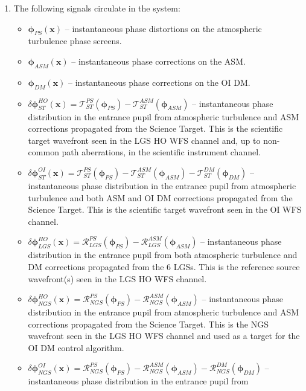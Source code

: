 \begin{enumerate}
	\item The following signals circulate in the system:
	\begin{itemize}
		\item $\bm{\phi}_{PS}^{}(\bm{x})$ -- instantaneous phase distortions on the
		atmospheric turbulence phase screens.
		\item $\bm{\phi}_{ASM}^{}(\bm{x})$ -- instantaneous phase corrections on the
		ASM.
		\item $\bm{\phi}_{DM}^{}(\bm{x})$ -- instantaneous phase corrections on the
		OI DM.
		\item $\delta \bm{\phi}^{HO}_{ST} (\bm{x}) = \mathcal{T}^{PS}_{ST}
		(\bm{\phi}_{PS}^{}) - \mathcal{T}^{ASM}_{ST} (\bm{\phi}_{ASM}^{})$
		-- instantaneous phase distribution in the entrance pupil from
		atmospheric turbulence and ASM corrections propagated from the Science
		Target. This is the scientific target wavefront seen in the LGS HO WFS
		channel and, up to
		non-common path aberrations, in the scientific instrument channel.
		\item $\delta \bm{\phi}^{OI}_{ST} (\bm{x}) = \mathcal{T}^{PS}_{ST}
		(\bm{\phi}_{PS}^{}) - \mathcal{T}^{ASM}_{ST} (\bm{\phi}_{ASM}^{}) -
		\mathcal{T}^{DM}_{ST} (\bm{\phi}_{DM}^{})$
		-- instantaneous phase distribution in the entrance pupil from
		atmospheric turbulence and both ASM and OI DM corrections propagated from
		the Science Target. This is the scientific target wavefront seen in the OI
		WFS channel.
		\item $\delta \bm{\phi}_{LGS}^{HO} (\bm{x}) = \mathcal{R}^{PS}_{LGS}
		(\bm{\phi}_{PS}^{}) - \mathcal{R}^{ASM}_{LGS} (\bm{\phi}_{ASM}^{})$
		-- instantaneous phase distribution in the entrance pupil from both
		atmospheric turbulence and DM corrections propagated from the 6 LGSs. This
		is the reference source wavefront(s) seen in the LGS HO WFS channel.
		\item $\delta \bm{\phi}^{HO}_{NGS} (\bm{x}) = \mathcal{R}^{PS}_{NGS}
		(\bm{\phi}_{PS}^{}) - \mathcal{R}^{ASM}_{NGS} (\bm{\phi}_{ASM}^{})$
		-- instantaneous phase distribution in the entrance pupil from
		atmospheric turbulence and ASM corrections propagated from the Science
		Target. This is the NGS wavefront seen in the LGS HO WFS
		channel and used as a target for the OI DM control algorithm.
		\item $\delta \bm{\phi}_{NGS}^{OI} (\bm{x}) = \mathcal{R}^{PS}_{NGS}
		(\bm{\phi}_{PS}^{}) - \mathcal{R}^{ASM}_{NGS} (\bm{\phi}_{ASM}^{}) -
		\mathcal{R}^{DM}_{NGS} (\bm{\phi}_{DM}^{})$
		-- instantaneous phase distribution in the entrance pupil from

\end{itemize}
\end{enumerate}
